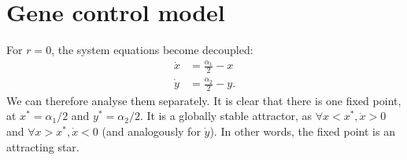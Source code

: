 \section{Gene control model}

For $r = 0$, the system equations become decoupled:
%
\begin{align*}
\dot{x} &= \frac{\alpha_1}{2} - x  \\
\dot{y} &= \frac{\alpha_2}{2} - y.
\end{align*}
%
We can therefore analyse them separately. It is clear that there is one fixed point, at $x^* = \alpha_1/2$ and $y^* = \alpha_2/2$. It is a globally stable attractor, as $\forall x < x^*, \dot{x} > 0$ and $\forall x > x^*, \dot{x} < 0$ (and analogously for $\dot{y}$). In other words, the fixed point is an attracting star.




